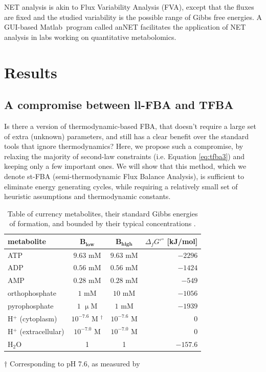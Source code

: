 \documentclass[twocolumn]{article}
\begin{document}
NET analysis is akin to Flux Variability Analysis (FVA), except that the fluxes are fixed and the studied variability is the possible range of Gibbs free energies. A GUI-based Matlab\texttrademark~program called anNET \cite{Zamboni2008} facilitates the application of NET analysis in labs working on quantitative metabolomics.

\section{Results}

\subsection{A compromise between ll-FBA and TFBA}
Is there a version of thermodynamic-based FBA, that doesn't require a large set of extra (unknown) parameters, and still has a clear benefit over the standard tools that ignore thermodynamics? Here, we propose such a compromise, by relaxing the majority of second-law constraints (i.e. Equation \ref{eq:tfba3}) and keeping only a few important ones. We will show that this method, which we denote st-FBA (semi-thermodynamic Flux Balance Analysis), is sufficient to eliminate energy generating cycles, while requiring a relatively small set of heuristic assumptions and thermodynamic constants.

\begin{table}[ht!]
	\caption{Table of currency metabolites, their standard Gibbs energies of formation, and bounded by their typical concentrations \cite{Bennett2009-rm}.}
	\begin{tabular}{l|c|c|r}
		\label{table:potentials}
		\textbf{metabolite} & $\mathbf{B_{low}}$ & $\mathbf{B_{high}}$ & $\Delta_f G'^\circ$ [kJ/mol] \\ \hline
		ATP & $9.63$ mM & $9.63$ mM & $-2296$ \\
		ADP & $0.56$ mM & $0.56$ mM & $-1424$ \\
		AMP & $0.28$ mM & $0.28$ mM & $-549$ \\
		orthophosphate & $1$ mM & $10$ mM & $-1056$ \\
		pyrophosphate & $1$ $\upmu$M & $1$ mM & $-1939$ \\
		H$^+$ (cytoplasm) & $10^{-7.6}$ M $^\dagger$ & $10^{-7.6}$ M & $0$ \\
		H$^+$ (extracellular) & $10^{-7.0}$ M & $10^{-7.0}$ M & $0$ \\
		H$_2$O & 1 & 1 & $-157.6$
	\end{tabular}
	\begin{tablenotes}
		\tiny
		\item $\dagger$ Corresponding to pH 7.6, as measured by \cite{Wilks2007-lh}
	\end{tablenotes}
\end{table}
\end{document}

